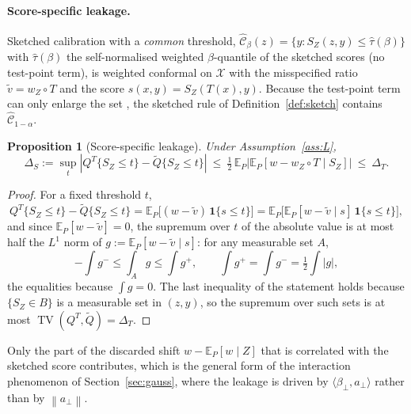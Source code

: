 \documentclass[11pt,a4paper]{article}
\newcommand{\norm}[1]{\left\|#1\right\|}
\newcommand{\abs}[1]{\left|#1\right|}
\newcommand{\E}{\mathbb{E}}
\newcommand{\TV}{\operatorname{TV}}
\newcommand{\Cset}{\widehat{\mathcal C}}
\newcommand{\Qt}{\widetilde Q}
\newcommand{\ind}{\mathbf 1}
\theoremstyle{plain}
\newtheorem{proposition}[theorem]{Proposition}
\theoremstyle{definition}
\theoremstyle{remark}
\begin{document}
\paragraph{Score-specific leakage.}
Sketched calibration with a \emph{common} threshold, $\Cset_\beta(z)=\{y:S_Z(z,y)\le\hat\tau(\beta)\}$ with $\hat\tau(\beta)$ the self-normalised weighted $\beta$-quantile of the sketched scores (no test-point term), is weighted conformal on $\mathcal X$ with the misspecified ratio $\tilde v=w_Z\circ T$ and the score $s(x,y)=S_Z(T(x),y)$. Because the test-point term can only enlarge the set \cite[eq.\ (3)]{pournaderi2026}, the sketched rule of Definition~\ref{def:sketch} contains $\Cset_{1-\alpha}$.

\begin{proposition}[Score-specific leakage]\label{prop:scoreleak}
Under Assumption~\ref{ass:L},
\[
\Delta_S:=\sup_{t}\abs{Q^T\{S_Z\le t\}-\Qt\{S_Z\le t\}}\ \le\ \tfrac12\,\E_P\abs{\E_P[w-w_Z\circ T\mid S_Z]}\ \le\ \Delta_T .
\]
\end{proposition}
\begin{proof}
For a fixed threshold $t$,
\[
Q^T\{S_Z\le t\}-\Qt\{S_Z\le t\}=\E_P\bigl[(w-\tilde v)\,\ind\{s\le t\}\bigr]=\E_P\bigl[\E_P[w-\tilde v\mid s]\,\ind\{s\le t\}\bigr],
\]
and since $\E_P[w-\tilde v]=0$, the supremum over $t$ of the absolute value is at most half the $L^1$ norm of $g:=\E_P[w-\tilde v\mid s]$: for any measurable set $A$,
\[
-\int g^-\le\int_Ag\le\int g^+,\qquad \int g^+=\int g^-=\tfrac12\int|g|,
\]
the equalities because $\int g=0$. The last inequality of the statement holds because $\{S_Z\in B\}$ is a measurable set in $(z,y)$, so the supremum over such sets is at most $\TV(Q^T,\Qt)=\Delta_T$.
\end{proof}

Only the part of the discarded shift $w-\E_P[w\mid Z]$ that is correlated with the sketched score contributes, which is the general form of the interaction phenomenon of Section~\ref{sec:gauss}, where the leakage is driven by $\langle\beta_\perp,a_\perp\rangle$ rather than by $\norm{a_\perp}$.
\end{document}
